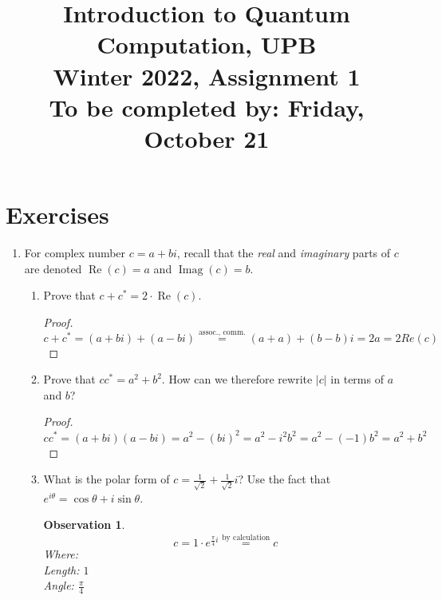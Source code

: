 \documentclass{article}
\newtheorem{observation}[theorem]{Observation}
\newcommand{\abs}[1]{\left\lvert #1 \right\rvert}
\begin{document}
\title{\vspace{-10mm}Introduction to Quantum Computation, UPB\\Winter 2022, Assignment 1\\{\large To be completed by: Friday, October 21}}
\date{}
\maketitle

\section{Exercises}
\begin{enumerate}
  \item %
        For complex number $c=a+bi$, recall that the \emph{real} and \emph{imaginary} parts of $c$ are denoted $\operatorname{Re}(c)=a$ and $\operatorname{Imag}(c)=b$.
        \begin{enumerate}
          \item %
                Prove that $c+c^\ast=2\cdot \operatorname{Re}(c)$.

                \begin{proof}
                  \begin{equation}
                    c+c^\ast = (a+bi) + (a-bi) \overset{\text{assoc., comm.}}{=}
                    (a + a) + (b - b)i = 2a = 2Re(c)
                  \end{equation}
                \end{proof}
          \item %
                Prove that $cc^\ast={a}^2+{b}^2$. How can we therefore rewrite $\abs{c}$ in terms of $a$ and $b$?

                \begin{proof}
                  \begin{equation}
                    cc^\ast=(a+bi)(a-bi)=a^2-(bi)^2=a^2-i^2b^2=a^2-(-1)b^2=a^2+b^2
                  \end{equation}
                \end{proof}
          \item %
                What is the polar form of $c=\frac{1}{\sqrt{2}}+\frac{1}{\sqrt{2}}i$? Use the fact that $e^{i\theta}=\cos\theta+i\sin\theta$.
                \begin{observation}
                  $$c=1\cdot e^{\frac{\pi}{4}i}\overset{\text{by calculation}}{=}c$$
                  Where:\\
                  Length: $1$\\
                  Angle: $\frac{\pi}{4}$
                \end{observation}


\end{enumerate}
\end{enumerate}
\end{document}
